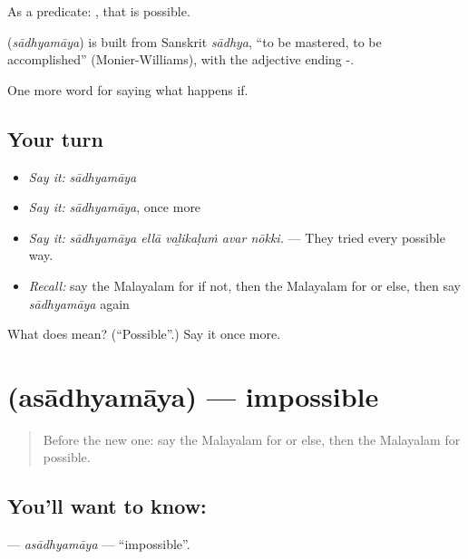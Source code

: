As a predicate:  , that is possible.

\begin{cousinweb}
\textbf{} (\emph{sādhyamāya}) is built from Sanskrit \emph{sādhya}, \textquotedblleft{}to be mastered, to be accomplished\textquotedblright{} (Monier-Williams), with the adjective ending -.
\end{cousinweb}

\begin{grammarlens}[title={What you've built}]
One more word for saying what happens if.
\end{grammarlens}

\subsection*{Your turn}
\begin{itemize}
\raggedright
  \item \emph{Say it:} \emph{sādhyamāya}
  \item \emph{Say it:} \emph{sādhyamāya}, once more
  \item \emph{Say it:} \emph{sādhyamāya ellā vaḻikaḷuṁ avar nōkki.} — They tried every possible way.
  \item \emph{Recall:} say the Malayalam for if not, then the Malayalam for or else, then say \emph{sādhyamāya} again
\end{itemize}

\begin{tcolorbox}[breakable,colback=teal!4,colframe=teal!35!black,title={Before you move on}]
What does  mean? (\textquotedblleft{}Possible\textquotedblright{}.) Say it once more.
\end{tcolorbox}
\section[\texorpdfstring{\ml{അസാധ്യമായ} (asādhyamāya)}{അസാധ്യമായ (asādhyamāya)}]{ (asādhyamāya) — impossible}

\label{lesson:ML-C441-asadhyamaya}



\begin{quote}
Before the new one: say the Malayalam for or else, then the Malayalam for possible.
\end{quote}

\subsection*{You'll want to know: }
\textbf{} — \emph{asādhyamāya} — \textquotedblleft{}impossible\textquotedblright{}.

